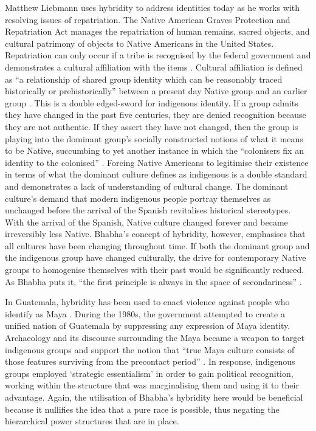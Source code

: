 	Matthew Liebmann uses hybridity to address identities today as he works with resolving issues of repatriation. The Native American Graves Protection and Repatriation Act manages the repatriation of human remains, sacred objects, and cultural patrimony of objects to Native Americans in the United States. Repatriation can only occur if a tribe is recognised by the federal government and demonstrates a cultural affiliation with the items \parencite[74]{Liebmann_2008}. Cultural affiliation is defined as “a relationship of shared group identity which can be reasonably traced historically or prehistorically” between a present day Native group and an earlier group  \parencite[75]{Liebmann_2008}. This is a double edged-sword for indigenous identity. If a group admits they have changed in the past five centuries, they are denied recognition because they are not authentic. If they assert they have not changed, then the group is playing into the dominant group’s socially constructed notions of what it means to be Native, succumbing to yet another instance in which the “colonisers fix an identity to the colonised” \parencite[77]{Anzaldua_1987}. Forcing Native Americans to legitimise their existence in terms of what the dominant culture defines as indigenous is a double standard and demonstrates a lack of understanding of cultural change. The dominant culture’s demand that modern indigenous people portray themselves as unchanged before the arrival of the Spanish revitalises historical stereotypes. With the arrival of the Spanish, Native culture changed forever and became irreversibly less Native. Bhabha’s concept of hybridity, however, emphasises that all cultures have been changing throughout time. If both the dominant group and the indigenous group have changed culturally, the drive for contemporary Native groups to homogenise themselves with their past would be significantly reduced. As Bhabha puts it, “the first principle is always in the space of secondariness” \parencite[83]{Mitchell_1995}.
	
	In Guatemala, hybridity has been used to enact violence against people who identify as Maya \parencite[6]{Warren_1998}. During the 1980s, the government attempted to create a unified nation of Guatemala by suppressing any expression of Maya identity. Archaeology and its discourse surrounding the Maya became a weapon to target indigenous groups and support the notion that “true Maya culture consists of those features surviving from the precontact period” \parencite[13]{FischerBrown_1996}. In response, indigenous groups employed ‘strategic essentialism’ \parencite[11-13]{Spivak_1990} in order to gain political recognition, working within the structure that was marginalising them and using it to their advantage. Again, the utilisation of Bhabha’s hybridity here would be beneficial because it nullifies the idea that a pure race is possible, thus negating the hierarchical power structures that are in place.
	
